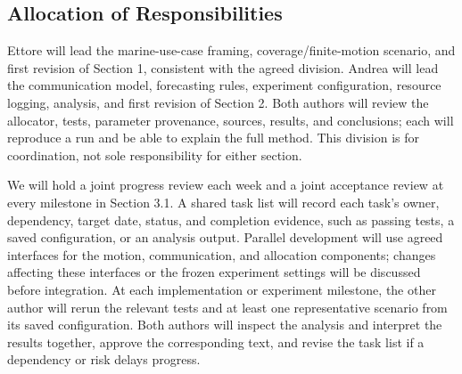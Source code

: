 \subsection{Allocation of Responsibilities}
Ettore will lead the marine-use-case framing, coverage/finite-motion scenario, and first revision of Section 1, consistent with the agreed division. Andrea will lead the communication model, forecasting rules, experiment configuration, resource logging, analysis, and first revision of Section 2. Both authors will review the allocator, tests, parameter provenance, sources, results, and conclusions; each will reproduce a run and be able to explain the full method. This division is for coordination, not sole responsibility for either section.

We will hold a joint progress review each week and a joint acceptance review at every milestone in Section 3.1. A shared task list will record each task's owner, dependency, target date, status, and completion evidence, such as passing tests, a saved configuration, or an analysis output. Parallel development will use agreed interfaces for the motion, communication, and allocation components; changes affecting these interfaces or the frozen experiment settings will be discussed before integration. At each implementation or experiment milestone, the other author will rerun the relevant tests and at least one representative scenario from its saved configuration. Both authors will inspect the analysis and interpret the results together, approve the corresponding text, and revise the task list if a dependency or risk delays progress.
